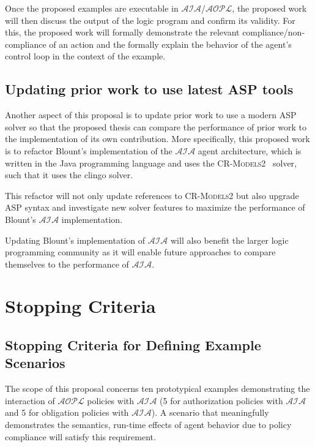 Once the proposed examples are executable in $\mathcal{AIA}$/$\mathcal{AOPL}$, the proposed work will then discuss the output of the logic program and confirm its validity.
For this, the proposed work will formally demonstrate the relevant compliance/non-compliance of an action and the formally explain the behavior of the agent's control loop in the context of the example.

\subsection{Updating prior work to use latest ASP tools}

Another aspect of this proposal is to update prior work to use a modern ASP solver so that the proposed thesis can compare the performance of prior work to the implementation of its own contribution.
More specifically, this proposed work is to refactor Blount's implementation of the $\mathcal{AIA}$ agent architecture, which is written in the Java programming language and uses the \textsc{CR-Models2}~\citep{balduccini_cr-models_2007} solver, such that it uses the clingo solver.

This refactor will not only update references to \textsc{CR-Models2} but also upgrade ASP syntax and investigate new solver features to maximize the performance of Blount's $\mathcal{AIA}$ implementation.

Updating Blount's implementation of $\mathcal{AIA}$ will also benefit the larger logic programming community as it will enable future approaches to compare themselves to the performance of $\mathcal{AIA}$.

\section{Stopping Criteria}

\subsection{Stopping Criteria for Defining Example Scenarios}

The scope of this proposal concerns ten prototypical examples demonstrating the interaction of $\mathcal{AOPL}$ policies with $\mathcal{AIA}$ (5 for authorization policies with $\mathcal{AIA}$ and 5 for obligation policies with $\mathcal{AIA}$).
A scenario that meaningfully demonstrates the semantics, run-time effects of agent behavior due to policy compliance will satisfy this requirement.


